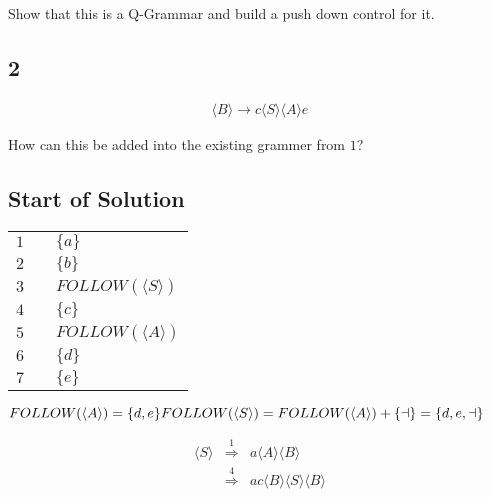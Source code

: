 \documentclass[a4paper,12pt]{article}
\newcommand{\nonterminal}[1]{\langle #1 \rangle}
\begin{document}
Show that this is a Q-Grammar and build a push down control for it.

\subsection*{2}

\begin{eqnarray}
\nonterminal{B} \to c \nonterminal{S} \nonterminal{A} e
\end{eqnarray}

How can this be added into the existing grammer from $1$?

\subsection*{Start of Solution}

\begin{tabular}{lcl}
$1$	&	\hspace{10mm}	&	$\{a\}$	\\
$2$	&						&	$\{b\}$	\\
$3$	&						&	$FOLLOW(\nonterminal{S})$	\\
$4$	&						&	$\{c\}$	\\
$5$	&						&	$FOLLOW(\nonterminal{A})$	\\
$6$	&						&	$\{d\}$	\\
$7$	&						&	$\{e\}$	\\
\end{tabular}

$FOLLOW(\nonterminal{A}) = \{d,e\} \\
FOLLOW(\nonterminal{S}) = FOLLOW(\nonterminal{A}) + \{\dashv\} =
\{d,e,\dashv\}$

\begin{eqnarray*}
\nonterminal{S} 	&	\stackrel{1}{\Rightarrow} 	& a\nonterminal{A}\nonterminal{B}	\\
						&	\stackrel{4}{\Rightarrow} 	& ac \nonterminal{B} \nonterminal{S} \nonterminal{B} \\
\end{eqnarray*}
\end{document}
